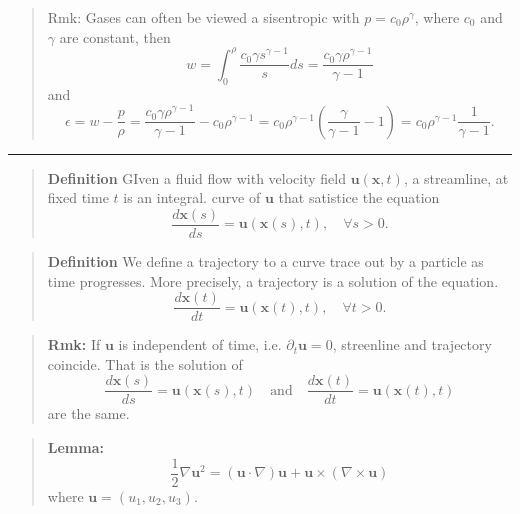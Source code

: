 \begin{quote}
	Rmk: Gases can often be viewed a sisentropic with $p=c_0\rho^\gamma$, where $c_0$ and $\gamma$ are constant, then
\begin{equation}
w = \int_{0}^{\rho} \frac{c_0\gamma s^{\gamma-1}}{s}ds = \frac{c_0\gamma\rho^{\gamma-1}}{\gamma-1}
\end{equation}
and
\begin{equation}
\epsilon = w-\frac{p}{\rho} = \frac{c_0\gamma \rho^{\gamma-1}}{\gamma-1} - c_0\rho^{\gamma-1} = c_0\rho^{\gamma-1}\left(\frac{\gamma}{\gamma-1}-1\right) = c_0\rho^{\gamma-1}\frac{1}{\gamma-1}.
\end{equation}

\end{quote}
\vspace{5pt}
\hrule
\vspace{6pt}

\begin{quote}
	\textbf{Definition}
GIven a fluid flow with velocity field $\textbf{u}(\textbf{x},t)$, a streamline, at fixed time $t$ is an integral. curve of $\textbf{u}$ that satistice the equation
\begin{equation}
\frac{d\textbf{x}(s)}{ds} = \textbf{u}(\textbf{x}(s),t),\quad\forall s>0.
\end{equation}

\end{quote}
\begin{quote}
	\textbf{Definition}
We define a trajectory to a curve trace out by a particle as time progresses. More precisely, a trajectory is a solution of the equation.
\begin{equation}
\frac{d\textbf{x}(t)}{dt} = \textbf{u}(\textbf{x}(t),t),\quad\forall t>0.
\end{equation}

\end{quote}
\begin{quote}
	\textbf{Rmk:}
If $\textbf{u}$ is independent of time, i.e. $\partial_t \textbf{u} = 0$, streenline and trajectory coincide. That is the solution of
\begin{equation}
\frac{d\textbf{x}(s)}{ds} = \textbf{u}(\textbf{x}(s),t)
\quad\text{and}\quad
\frac{d\textbf{x}(t)}{dt} = \textbf{u}(\textbf{x}(t),t)
\end{equation}
are the same.
\end{quote}

\begin{quote}
	\textbf{Lemma:}
\begin{equation}
\frac{1}{2}\nabla \textbf{u}^2 = \left(\textbf{u}\cdot \nabla\right)\textbf{u} + \textbf{u}\times\left(\nabla\times\textbf{u}\right)
\end{equation}
where $\textbf{u} = (u_1,u_2,u_3)$.
\end{quote}

